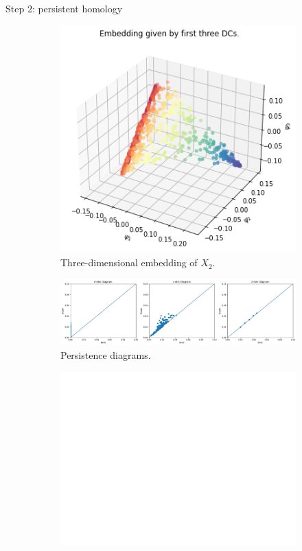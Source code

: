 \documentclass[xcolor={dvipsnames,svgnames}]{beamer}
\begin{document}
\begin{frame}{Step 2: persistent homology}
\begin{figure}[H]
\centering
\begin{subfigure}[b]{0.2\textwidth}
    \includegraphics[width=\textwidth]{figures/X2_embedding.png}
    \caption{Three-dimensional embedding of $X_2$.}
\end{subfigure}
\hfill
\begin{subfigure}[b]{0.75\textwidth}
    \includegraphics[width=\textwidth]{figures/X2_H0.png}
    \caption{Persistence diagrams.}
\end{subfigure}
\begin{subfigure}[b]{0.25\textwidth}
\includegraphics[width=\textwidth]{figures/white.png} 

\end{subfigure}
\end{figure}
\end{frame}
\end{document}
